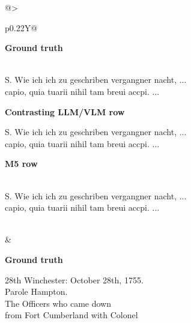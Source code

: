 \begin{table}[p]
\begin{tabularx}{\linewidth}{@{}>{\raggedright\arraybackslash}p{0.22\linewidth}Y@{}}
\begin{minipage}[t]{\hsize}
      \textbf{Ground truth}\par
      {\raggedright{}\excerptnl\\
      S. Wie ich ich zu geschriben vergangner nacht, ...\excerptnl\\
      capio, quia tuarii nihil tam breui accpi. ...\par}
      \vspace{0.3em}
      \textbf{Contrasting LLM/VLM row}\par
      {\raggedright\ttfamily
      S. Wie ich ich zu geschriben vergangner nacht, ...\excerptnl\\
      capio, quia tuarii nihil tam breui accpi. ...\par}
      \vspace{0.3em}
      \textbf{M5 row}\par
      {\raggedright{}\excerptnl\\
      S. Wie ich ich zu geschriben vergangner nacht, ...\excerptnl\\
      capio, quia tuarii nihil tam breui accpi. ...\par}
    \end{minipage}
    \\
    &
    \begin{minipage}[t]{\hsize}
      \textbf{Ground truth}\par
      {\raggedright\ttfamily
      28th Winchester: October 28th, 1755.\excerptnl\\
      Parole Hampton.\excerptnl\\
      The Officers who came down\excerptnl\\
      from Fort Cumberland with Colonel\excerptnl\\
}
\end{minipage}
\end{tabularx}
\end{table}
